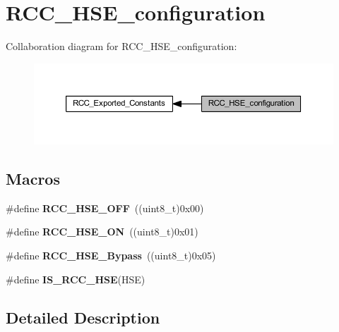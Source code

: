 \hypertarget{group___r_c_c___h_s_e__configuration}{}\section{R\+C\+C\+\_\+\+H\+S\+E\+\_\+configuration}
\label{group___r_c_c___h_s_e__configuration}
Collaboration diagram for R\+C\+C\+\_\+\+H\+S\+E\+\_\+configuration\+:\nopagebreak
\begin{figure}[H]
\begin{center}
\leavevmode
\includegraphics[width=350pt]{group___r_c_c___h_s_e__configuration}
\end{center}
\end{figure}
\subsection*{Macros}
\begin{DoxyCompactItemize}
\item 
\mbox{\label{group___r_c_c___h_s_e__configuration_ga1616626d23fbce440398578855df6f97}} 
\#define {\bfseries R\+C\+C\+\_\+\+H\+S\+E\+\_\+\+O\+FF}~((uint8\+\_\+t)0x00)
\item 
\mbox{\label{group___r_c_c___h_s_e__configuration_gabc4f70a44776c557af20496b04d9a9db}} 
\#define {\bfseries R\+C\+C\+\_\+\+H\+S\+E\+\_\+\+ON}~((uint8\+\_\+t)0x01)
\item 
\mbox{\label{group___r_c_c___h_s_e__configuration_ga09061e9909d5f588baa7bfb0f7edd9fa}} 
\#define {\bfseries R\+C\+C\+\_\+\+H\+S\+E\+\_\+\+Bypass}~((uint8\+\_\+t)0x05)
\item 
\#define {\bfseries I\+S\+\_\+\+R\+C\+C\+\_\+\+H\+SE}(H\+SE)
\end{DoxyCompactItemize}


\subsection{Detailed Description}


